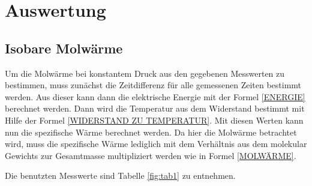 \section{Auswertung}
\subsection{Isobare Molwärme}
Um die Molwärme bei konstantem Druck aus den gegebenen Messwerten zu bestimmen, muss zunächst die Zeitdifferenz für alle gemessenen Zeiten bestimmt werden. Aus dieser kann dann die elektrische Energie mit der Formel \ref{ENERGIE} berechnet werden. Dann wird die Temperatur aus dem Widerstand bestimmt mit Hilfe der Formel \ref{WIDERSTAND ZU TEMPERATUR}. Mit diesen Werten kann nun die spezifische Wärme berechnet werden. Da hier die Molwärme betrachtet wird, muss die spezifische Wärme lediglich mit dem Verhältnis aus dem molekular Gewichts zur Gesamtmasse multipliziert werden wie in Formel \ref{MOLWÄRME}.

\noindent Die benutzten Messwerte sind Tabelle \ref{fig:tab1} zu entnehmen.   


